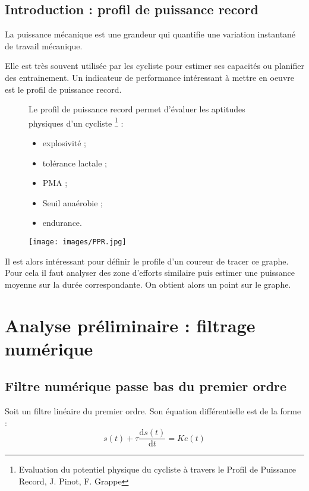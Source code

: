 

\subsection{Introduction : profil de puissance record}

La puissance mécanique est une grandeur qui quantifie une variation instantané de travail mécanique. 

Elle est très souvent utilisée par les cycliste pour estimer ses capacités ou planifier des entrainement.
Un indicateur de performance intéressant à mettre en oeuvre est le profil de puissance record.




\begin{figure}[!htb]
\begin{minipage}{0.5\textwidth}
Le profil de puissance record permet d'évaluer les aptitudes physiques d'un cycliste \footnote{Evaluation du potentiel physique du cycliste à travers le Profil de Puissance Record, J. Pinot, F. Grappe}  : 
\begin{itemize}
\item explosivité ;
\item tolérance lactale ;
\item PMA ;
\item Seuil anaérobie ;
\item endurance.
\end{itemize}
\end{minipage}
\begin{minipage}{0.5\textwidth}
\begin{center}
\texttt{[image: images/PPR.jpg]}
\caption{\label{PPR}}
\end{center}
\end{minipage}
\end{figure}

Il est alors intéressant pour définir le profile d'un coureur de tracer ce graphe. Pour cela il faut analyser des zone d'efforts similaire puis estimer une puissance moyenne sur la durée correspondante. On obtient alors un point sur le graphe.


\section{Analyse préliminaire : filtrage numérique}




\subsection{Filtre numérique passe bas du premier ordre}
Soit un filtre linéaire du premier ordre. Son équation différentielle est de la forme :
$$
s(t)+\tau \dfrac{\text{d} s(t) }{\text{d}t} = K e(t)
$$

